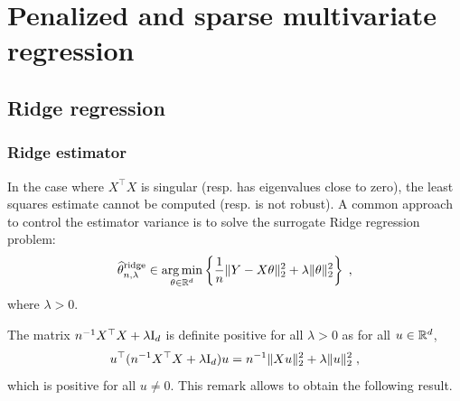 \chapter{Penalized and sparse multivariate regression}
\minitoc


\section{Ridge regression}
\subsection{Ridge estimator}
In the case where $X^\top X$ is singular (resp. has eigenvalues close to zero), the least squares estimate cannot be computed (resp. is not robust). A common approach to control the estimator variance is to solve the surrogate Ridge regression problem:
\[
\widehat \param^{\mathrm{ridge}}_{n,\lambda}\in  \argmin_{\param\in\rset^d}  \left\{\frac{1}{n}\|Y - X\param\|_2^2 + \lambda\|\param\|_2^2\right\}\eqsp,
\]
where $\lambda>0$. 
\begin{remark}
The matrix $n^{-1}X^\top X + \lambda  \mathrm{I}_d$ is definite positive for all $\lambda>0$ as for all $u\in\mathbb{R}^d$,
\[
u^\top (n^{-1}X^\top X + \lambda \mathrm{I}_d)u = n^{-1}\|Xu\|_2^2 + \lambda  \|u\|_2^2\;,
\]
which is positive for all $u\neq 0$. This remark allows to obtain the following result.
\end{remark}

